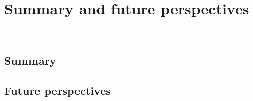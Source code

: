 \chapter{Summary and future perspectives}
\label{Conclusions}
\thispagestyle{empty}

\newpage
\thispagestyle{empty}
\ %
\newpage

\section{Summary}


\section{Future perspectives}


\newpage
\thispagestyle{empty}
\ %
\newpage